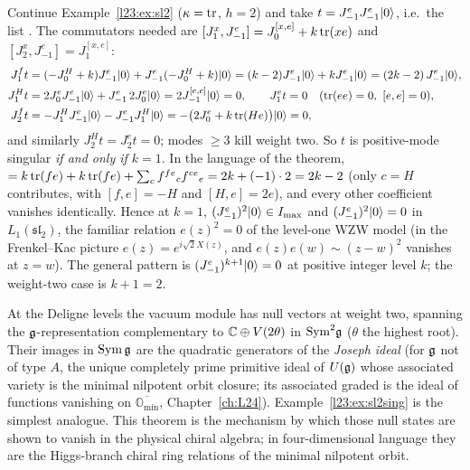 \begin{example}\label{l23:ex:sl2sing}
Continue Example~\ref{l23:ex:sl2} ($\kappa=\operatorname{tr}$, $h=2$) and take $t=J^e_{-1}J^e_{-1}|0\rangle$, i.e.\ the list \lean{[(1, e, e)]}. The
commutators needed are $[J^x_1,J^e_{-1}]=J^{[x,e]}_0+k\operatorname{tr}(xe)$ and $[J^x_2,J^e_{-1}]=J^{[x,e]}_1$:
\begin{align*}
J^f_1t&=(-J^H_0+k)J^e_{-1}|0\rangle+J^e_{-1}(-J^H_0+k)|0\rangle=(k-2)J^e_{-1}|0\rangle+kJ^e_{-1}|0\rangle=(2k-2)\,J^e_{-1}|0\rangle,\\
J^H_1t&=2J^e_0J^e_{-1}|0\rangle+J^e_{-1}\,2J^e_0|0\rangle=2J^{[e,e]}_{-1}|0\rangle=0,\qquad J^e_1t=0\quad(\operatorname{tr}(ee)=0,\ [e,e]=0),\\
J^f_2t&=-J^H_1J^e_{-1}|0\rangle-J^e_{-1}J^H_1|0\rangle=-\big(2J^e_0+k\operatorname{tr}(He)\big)|0\rangle=0,
\end{align*}
and similarly $J^H_2t=J^e_2t=0$; modes $\ge3$ kill weight two. So $t$ is positive-mode singular \emph{if and only if $k=1$}. In the
language of the theorem,  $=k\operatorname{tr}(fe)+k\operatorname{tr}(fe)+\sum_cf^{fe}{}_cf^{ce}{}_e=2k+(-1)\cdot2=2k-2$ (only $c=H$
contributes, with $[f,e]=-H$ and $[H,e]=2e$), and every other coefficient vanishes identically. Hence at $k=1$,
$(J^e_{-1})^2|0\rangle\in I_{\max}$ and $(J^e_{-1})^2|0\rangle=0$ in $L_1(\mathfrak{sl}_2)$, the familiar relation $e(z)^2=0$ of the
level-one WZW model (in the Frenkel--Kac picture $e(z)=e^{i\sqrt2X(z)}$, and $e(z)e(w)\sim(z-w)^2$ vanishes at $z=w$). The general
pattern is $(J^e_{-1})^{k+1}|0\rangle=0$ at positive integer level $k$; the weight-two case is $k+1=2$.
\end{example}

\begin{physics}
At the Deligne levels the vacuum module has null vectors at weight two, spanning the $\mathfrak g$-representation complementary to
${\mathbb{C}}\oplus V(2\theta)$ in $\mathrm{Sym}^2\mathfrak g$ ($\theta$ the highest root). Their images in $\mathrm{Sym}\,\mathfrak g$ are the quadratic
generators of the \emph{Joseph ideal} (for $\mathfrak g$ not of type $A$, the unique completely prime primitive ideal of $U(\mathfrak g)$
whose associated variety is the minimal nilpotent orbit closure; its associated graded is the ideal of functions vanishing on
$\overline{\mathbb O_{\min}}$, Chapter~\ref{ch:L24}). Example~\ref{l23:ex:sl2sing} is the simplest analogue. This theorem is the mechanism by which those
null states are shown to vanish in the physical chiral algebra; in four-dimensional language they are the Higgs-branch chiral
ring relations of the minimal nilpotent orbit.
\end{physics}

